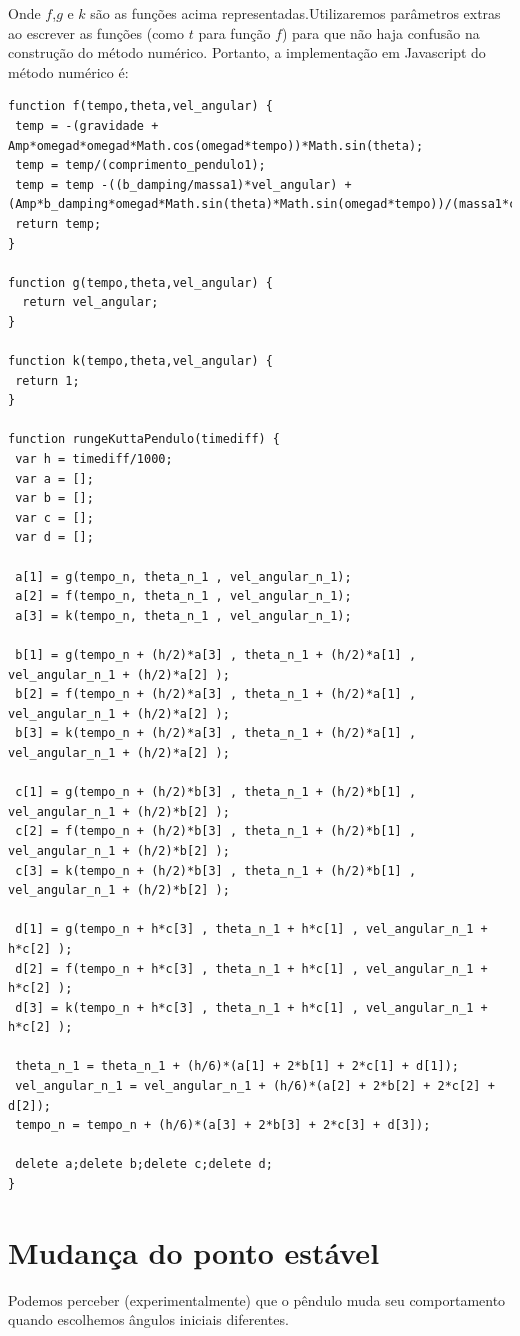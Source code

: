 \documentclass[13pt,a4paper]{report}
\begin{document}
Onde $f$,$g$ e $k$ são as funções acima representadas.Utilizaremos parâmetros extras ao escrever as 
funções (como $t$ para função $f$) para que não haja confusão na construção do método numérico.
\clearpage
Portanto, a implementação em Javascript do método numérico é:
\begin{lstlisting}
function f(tempo,theta,vel_angular) {                      
 temp = -(gravidade + Amp*omegad*omegad*Math.cos(omegad*tempo))*Math.sin(theta);
 temp = temp/(comprimento_pendulo1);
 temp = temp -((b_damping/massa1)*vel_angular) + (Amp*b_damping*omegad*Math.sin(theta)*Math.sin(omegad*tempo))/(massa1*comprimento_pendulo1);     
 return temp;    
}

function g(tempo,theta,vel_angular) {   
  return vel_angular;
}

function k(tempo,theta,vel_angular) {
 return 1;
}
           
function rungeKuttaPendulo(timediff) {    
 var h = timediff/1000;
 var a = [];
 var b = [];
 var c = [];
 var d = [];

 a[1] = g(tempo_n, theta_n_1 , vel_angular_n_1);
 a[2] = f(tempo_n, theta_n_1 , vel_angular_n_1);
 a[3] = k(tempo_n, theta_n_1 , vel_angular_n_1);

 b[1] = g(tempo_n + (h/2)*a[3] , theta_n_1 + (h/2)*a[1] , vel_angular_n_1 + (h/2)*a[2] );
 b[2] = f(tempo_n + (h/2)*a[3] , theta_n_1 + (h/2)*a[1] , vel_angular_n_1 + (h/2)*a[2] );
 b[3] = k(tempo_n + (h/2)*a[3] , theta_n_1 + (h/2)*a[1] , vel_angular_n_1 + (h/2)*a[2] );
        
 c[1] = g(tempo_n + (h/2)*b[3] , theta_n_1 + (h/2)*b[1] , vel_angular_n_1 + (h/2)*b[2] );
 c[2] = f(tempo_n + (h/2)*b[3] , theta_n_1 + (h/2)*b[1] , vel_angular_n_1 + (h/2)*b[2] );
 c[3] = k(tempo_n + (h/2)*b[3] , theta_n_1 + (h/2)*b[1] , vel_angular_n_1 + (h/2)*b[2] );

 d[1] = g(tempo_n + h*c[3] , theta_n_1 + h*c[1] , vel_angular_n_1 + h*c[2] );
 d[2] = f(tempo_n + h*c[3] , theta_n_1 + h*c[1] , vel_angular_n_1 + h*c[2] );
 d[3] = k(tempo_n + h*c[3] , theta_n_1 + h*c[1] , vel_angular_n_1 + h*c[2] );
                
 theta_n_1 = theta_n_1 + (h/6)*(a[1] + 2*b[1] + 2*c[1] + d[1]); 
 vel_angular_n_1 = vel_angular_n_1 + (h/6)*(a[2] + 2*b[2] + 2*c[2] + d[2]);     
 tempo_n = tempo_n + (h/6)*(a[3] + 2*b[3] + 2*c[3] + d[3]); 
    
 delete a;delete b;delete c;delete d;
}
\end{lstlisting}
\clearpage

\section{Mudança do ponto estável}
Podemos perceber (experimentalmente) que o pêndulo muda seu comportamento quando escolhemos ângulos iniciais diferentes.
\end{document}
